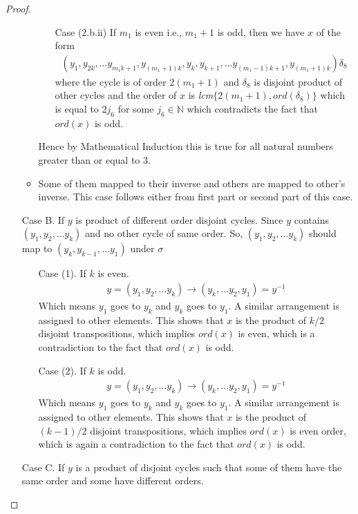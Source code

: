 \documentclass[oneside]{amsart}
\theoremstyle{plain}
\theoremstyle{definition}
\theoremstyle{remark}
\newcommand{\ord}{ord}
\begin{document}
\begin{proof}
\begin{itemize}
\begin{itemize}
\begin{itemize}
                        \item[Case (2.b.ii)] If $m_1$ is even i.e., $m_1 + 1$ is odd, then we have $x$ of the form
                        \begin{align*}
                            (y_1, y_{2k}, \ldots y_{m_1k + 1}, y_{(m_1 + 1)k}, y_k, y_{k + 1}, \ldots y_{(m_1 - 1)k + 1}, y_{(m_1 + 1)k})\delta_8
                        \end{align*} where the cycle is of order $2(m_1 + 1)$ and $\delta_8$ is disjoint product of other cycles and the order of $x$ is \textit{lcm}$\{2(m_1 + 1), \ord(\delta_8)\}$ which is equal to $2j_6$ for some $j_6 \in \mathbb{N}$ which contradicts the fact that $\ord(x)$ is odd.
                    \end{itemize}
                    Hence by Mathematical Induction this is true for all natural numbers greater than or equal to 3.
                    \item Some of them mapped to their inverse and others are mapped to other's inverse. This case follows either from first part or second part of this case.
                \end{itemize}
                \item[Case B.] If $y$ is product of different order disjoint cycles. 
                Since $y$ contains $(y_1, y_2, \ldots y_k)$ and no other cycle of same order. So, $(y_1, y_2, \ldots y_k)$ should map to $(y_k, y_{k - 1}, \ldots y_1)$ under $\sigma$
                    \begin{enumerate}
                        \item[Case (1).] If $k$ is even. \begin{align*}
                            y = (y_1, y_2, \ldots y_k) \rightarrow (y_k, \ldots y_2, y_1) = y^{-1}
                        \end{align*}
                        Which means $y_1$ goes to $y_k$ and $y_k$ goes to $y_1$. A similar arrangement is assigned to other elements. This shows that $x$ is the product of $k/2$ disjoint transpositions, which implies $\ord (x)$ is even, which is a contradiction to the fact that $\ord(x)$ is odd.
                        \item[Case (2).] If $k$ is odd.
                        \begin{align*}
                            y = (y_1, y_2, \ldots y_k) \rightarrow (y_k, \ldots y_2, y_1) = y^{-1}
                        \end{align*}
                        Which means $y_1$ goes to $y_k$ and $y_k$ goes to $y_1$. A similar arrangement is assigned to other elements. This shows that $x$ is the product of $(k-1)/2$ disjoint transpositions, which implies $\ord(x)$ is even order, which is again a contradiction to the fact that $\ord(x)$ is odd.
                    \end{enumerate}
                \item[Case C.] If $y$ is a product of disjoint cycles such that some of them have the same order and some have different orders.


\end{itemize}
\end{proof}
\end{document}

